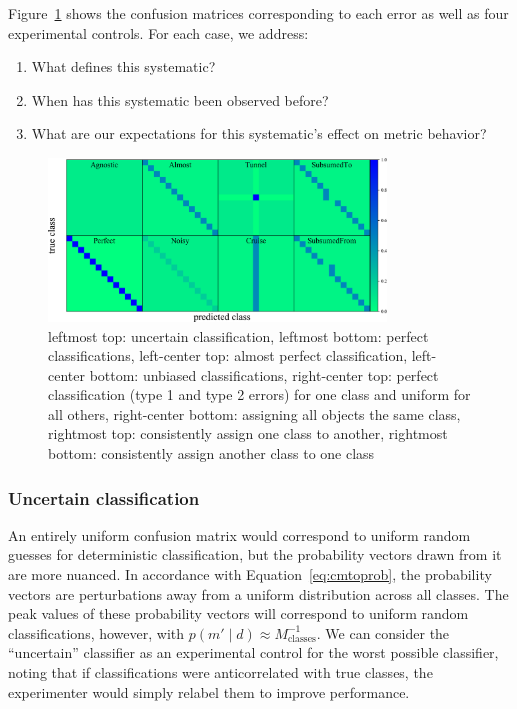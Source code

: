 Figure~\ref{fig:mock_cm} shows the confusion matrices corresponding to each error as well as four experimental controls.
For each case, we address:
\begin{enumerate}
  \item What defines this systematic?
  \item When has this systematic been observed before?
  \item What are our expectations for this systematic's effect on metric behavior?
\end{enumerate}

\begin{figure}
	\begin{center}
    \includegraphics[width=0.8\textwidth]{./fig/all_sim_cm.png}
		\caption{leftmost top: uncertain classification,
    leftmost bottom: perfect classifications,
    left-center top: almost perfect classification,
    left-center bottom: unbiased classifications,
    right-center top: perfect classification (type 1 and type 2 errors) for one class and uniform for all others,
    right-center bottom: assigning all objects the same class,
    rightmost top: consistently assign one class to another,
    rightmost bottom: consistently assign another class to one class}
		\label{fig:mock_cm}
	\end{center}
\end{figure}

\subsubsection{Uncertain classification}
\label{sec:uncertaindata}

An entirely uniform confusion matrix would correspond to uniform random guesses for deterministic classification, but the probability vectors drawn from it are more nuanced.
In accordance with Equation~\ref{eq:cmtoprob}, the probability vectors are perturbations away from a  uniform distribution across all classes.
The peak values of these probability vectors will correspond to uniform random classifications, however, with $p(m' \mid d)\approx M_{\mathrm{classes}}^{-1}$.
We can consider the ``uncertain'' classifier as an experimental control for the worst possible classifier, noting that if classifications were anticorrelated with true classes, the experimenter would simply relabel them to improve performance.

